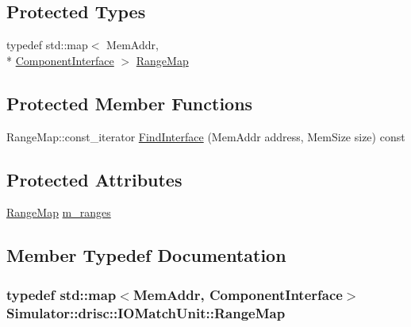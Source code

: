 \subsection*{Protected Types}
\begin{DoxyCompactItemize}
\item 
typedef std\+::map$<$ Mem\+Addr, \\*
\hyperlink{struct_simulator_1_1drisc_1_1_i_o_match_unit_1_1_component_interface}{Component\+Interface} $>$ \hyperlink{class_simulator_1_1drisc_1_1_i_o_match_unit_aa8059233383b2fea82a96da38a2784ce}{Range\+Map}
\end{DoxyCompactItemize}
\subsection*{Protected Member Functions}
\begin{DoxyCompactItemize}
\item 
Range\+Map\+::const\+\_\+iterator \hyperlink{class_simulator_1_1drisc_1_1_i_o_match_unit_a505053f6620c8fecfc8615a47d4c6ef8}{Find\+Interface} (Mem\+Addr address, Mem\+Size size) const 
\end{DoxyCompactItemize}
\subsection*{Protected Attributes}
\begin{DoxyCompactItemize}
\item 
\hyperlink{class_simulator_1_1drisc_1_1_i_o_match_unit_aa8059233383b2fea82a96da38a2784ce}{Range\+Map} \hyperlink{class_simulator_1_1drisc_1_1_i_o_match_unit_abd7fa33205080d9e5148e1220ed770b2}{m\+\_\+ranges}
\end{DoxyCompactItemize}


\subsection{Member Typedef Documentation}
\hypertarget{class_simulator_1_1drisc_1_1_i_o_match_unit_aa8059233383b2fea82a96da38a2784ce}{
\subsubsection[{Range\+Map}]{\setlength{\rightskip}{0pt plus 5cm}typedef std\+::map$<$Mem\+Addr, {\bf Component\+Interface}$>$ {\bf Simulator\+::drisc\+::\+I\+O\+Match\+Unit\+::\+Range\+Map}\hspace{0.3cm}{\ttfamily [protected]}}}\label{class_simulator_1_1drisc_1_1_i_o_match_unit_aa8059233383b2fea82a96da38a2784ce}


